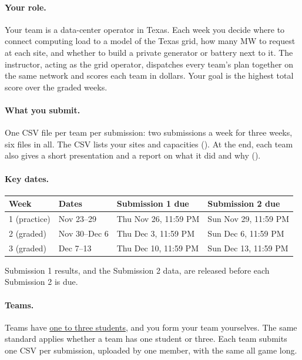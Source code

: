 \documentclass[10pt]{article}
\newcommand{\alert}[1]{{\color{alertblue}\uline{#1}}}
\newcommand{\code}[1]{\path{#1}}
\begin{document}
\paragraph{Your role.} Your team is a data-center operator in Texas. Each week
you decide where to connect computing load to a model of the Texas grid, how
many MW to request at each site, and whether to build a private generator or
battery next to it. The instructor, acting as the grid operator, dispatches
every team's plan together on the same network and scores each team in
dollars. Your goal is the highest total score over the graded weeks.

\paragraph{What you submit.} One CSV file per team per submission: two
submissions a week for three weeks, six files in all. The CSV lists your sites
and capacities (). At the end, each team also gives a short
presentation and a report on what it did and why
().

\paragraph{Key dates.}
\begin{center}
\small
\begin{tabularx}{\linewidth}{@{}l l X X@{}}
\toprule
Week & Dates & Submission 1 due & Submission 2 due\\
\midrule
1 (practice) & Nov 23--29 & Thu Nov 26, 11:59 PM & Sun Nov 29, 11:59 PM\\
2 (graded)   & Nov 30--Dec 6 & Thu Dec 3, 11:59 PM & Sun Dec 6, 11:59 PM\\
3 (graded)   & Dec 7--13 & Thu Dec 10, 11:59 PM & Sun Dec 13, 11:59 PM\\
\bottomrule
\end{tabularx}
\end{center}
Submission 1 results, and the Submission 2 data, are released before each
Submission 2 is due.

\paragraph{Teams.} Teams have \alert{one to three students}, and you form your
team yourselves. The same standard applies whether a team has one student or
three. Each team
submits one CSV per submission, uploaded by one member, with the same
\code{team_id} all game long.
\end{document}
